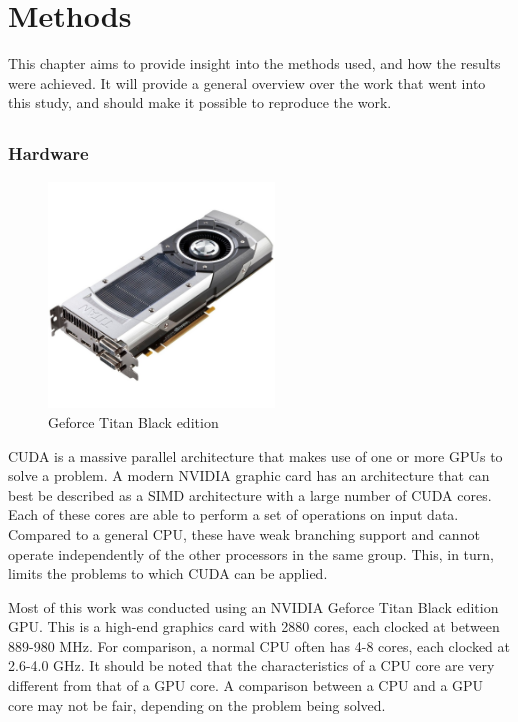 \documentclass[10pt,a4paper]{book}
\begin{document}
\newpage


\chapter{Methods}

This chapter aims to provide insight into the methods used, and how the results were achieved. It will provide a general overview over the work that went into this study, and should make it possible to reproduce the work.

\newpage


\section{}

\subsection{Hardware}


\begin{figure}[htp]
\centering
\includegraphics[width=60mm]{geforcetitan.jpg}
\caption{Geforce Titan Black edition}
\label{geforcetitanblack}
\end{figure}

\gls{CUDA} is a massive parallel architecture that makes use of one or more \glspl{GPU} to solve a problem. A modern NVIDIA graphic card has an architecture that can best be described as a \gls{SIMD} architecture with a large number of \gls{CUDA} cores. Each of these cores are able to perform a set of operations on input data. Compared to a general \gls{CPU}, these have weak branching support and cannot operate independently of the other processors in the same group. This, in turn, limits the problems to which \gls{CUDA} can be applied. 

Most of this work was conducted using an NVIDIA Geforce Titan Black edition \gls{GPU}. This is a high-end graphics card with 2880 cores, each clocked at between 889-980 MHz. For comparison, a normal \gls{CPU} often has 4-8 cores, each clocked at 2.6-4.0 GHz. It should be noted that the characteristics of a \gls{CPU} core are very different from that of a \gls{GPU} core. A comparison between a \gls{CPU} and a \gls{GPU} core may not be fair, depending on the problem being solved.
\end{document}
